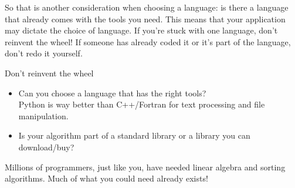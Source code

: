 So that is another consideration when choosing a language: is there a
language that already comes with the tools you need. This means that
your application may dictate the choice of language. If you're stuck
with one language, don't reinvent the wheel! If someone has already
coded it or it's part of the language, don't redo it yourself.

\begin{slide}{Don't reinvent the wheel}
  \label{sl:nowheel}
  \begin{itemize}
  \item Can you choose a language that has the right tools?\\
    Python is way better than C++/Fortran for text processing and file
    manipulation.
  \item Is your algorithm part of a standard library or a library you
    can download/buy?\\
  \end{itemize}
  Millions of programmers, just like you, have needed linear algebra
  and sorting algorithms. Much of what you could need already exists!
\end{slide}

\endinput

\Level 0 {Further reading}

Tutorial, assignments:
\url{http://www.cppforschool.com/}

Problems to practice:
\url{http://www.spoj.com/problems/classical/}
